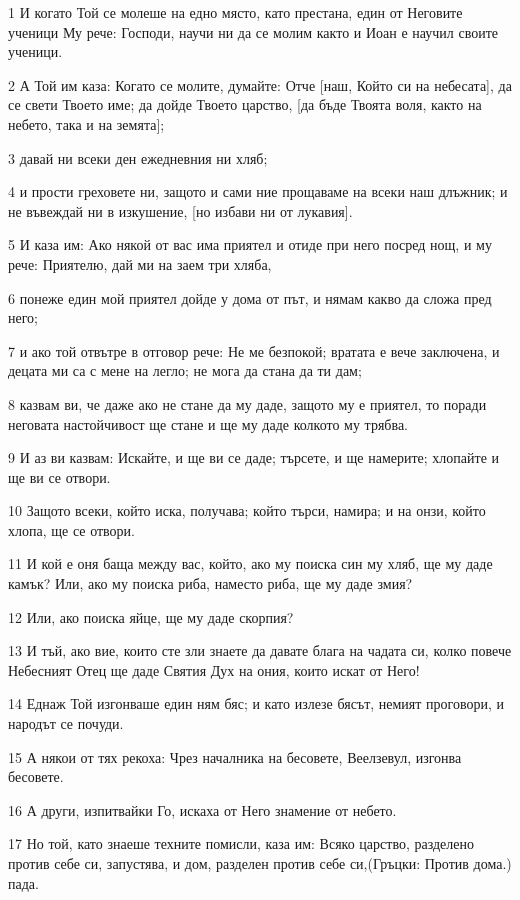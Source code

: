 \par 1 И когато Той се молеше на едно място, като престана, един от Неговите ученици Му рече: Господи, научи ни да се молим както и Иоан е научил своите ученици.
\par 2 А Той им каза: Когато се молите, думайте: Отче [наш, Който си на небесата], да се свети Твоето име; да дойде Твоето царство, [да бъде Твоята воля, както на небето, така и на земята];
\par 3 давай ни всеки ден ежедневния ни хляб;
\par 4 и прости греховете ни, защото и сами ние прощаваме на всеки наш длъжник; и не въвеждай ни в изкушение, [но избави ни от лукавия].
\par 5 И каза им: Ако някой от вас има приятел и отиде при него посред нощ, и му рече: Приятелю, дай ми на заем три хляба,
\par 6 понеже един мой приятел дойде у дома от път, и нямам какво да сложа пред него;
\par 7 и ако той отвътре в отговор рече: Не ме безпокой; вратата е вече заключена, и децата ми са с мене на легло; не мога да стана да ти дам;
\par 8 казвам ви, че даже ако не стане да му даде, защото му е приятел, то поради неговата настойчивост ще стане и ще му даде колкото му трябва.
\par 9 И аз ви казвам: Искайте, и ще ви се даде; търсете, и ще намерите; хлопайте и ще ви се отвори.
\par 10 Защото всеки, който иска, получава; който търси, намира; и на онзи, който хлопа, ще се отвори.
\par 11 И кой е оня баща между вас, който, ако му поиска син му хляб, ще му даде камък? Или, ако му поиска риба, наместо риба, ще му даде змия?
\par 12 Или, ако поиска яйце, ще му даде скорпия?
\par 13 И тъй, ако вие, които сте зли знаете да давате блага на чадата си, колко повече Небесният Отец ще даде Святия Дух на ония, които искат от Него!
\par 14 Еднаж Той изгонваше един ням бяс; и като излезе бясът, немият проговори, и народът се почуди.
\par 15 А някои от тях рекоха: Чрез началника на бесовете, Веелзевул, изгонва бесовете.
\par 16 А други, изпитвайки Го, искаха от Него знамение от небето.
\par 17 Но той, като знаеше техните помисли, каза им: Всяко царство, разделено против себе си, запустява, и дом, разделен против себе си,(Гръцки: Против дома.) пада.
